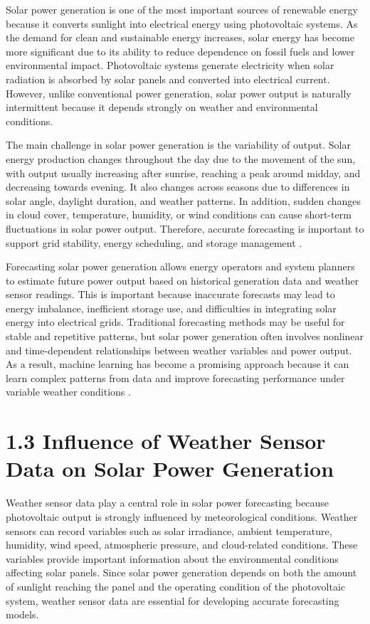 Solar power generation is one of the most important sources of renewable energy because it converts sunlight into electrical energy using photovoltaic systems. As the demand for clean and sustainable energy increases, solar energy has become more significant due to its ability to reduce dependence on fossil fuels and lower environmental impact. Photovoltaic systems generate electricity when solar radiation is absorbed by solar panels and converted into electrical current. However, unlike conventional power generation, solar power output is naturally intermittent because it depends strongly on weather and environmental conditions.

The main challenge in solar power generation is the variability of output. Solar energy production changes throughout the day due to the movement of the sun, with output usually increasing after sunrise, reaching a peak around midday, and decreasing towards evening. It also changes across seasons due to differences in solar angle, daylight duration, and weather patterns. In addition, sudden changes in cloud cover, temperature, humidity, or wind conditions can cause short-term fluctuations in solar power output. Therefore, accurate forecasting is important to support grid stability, energy scheduling, and storage management \parencite{JnanaVarshitha2025, Bakht2025, Eren2025, Alhassan2025}.

Forecasting solar power generation allows energy operators and system planners to estimate future power output based on historical generation data and weather sensor readings. This is important because inaccurate forecasts may lead to energy imbalance, inefficient storage use, and difficulties in integrating solar energy into electrical grids. Traditional forecasting methods may be useful for stable and repetitive patterns, but solar power generation often involves nonlinear and time-dependent relationships between weather variables and power output. As a result, machine learning has become a promising approach because it can learn complex patterns from data and improve forecasting performance under variable weather conditions \parencite{TsaiLo2025, CarvalhoJunior2025, ArellanosTafur2025}.

\section{1.3  Influence of Weather Sensor Data on Solar Power Generation}

Weather sensor data play a central role in solar power forecasting because photovoltaic output is strongly influenced by meteorological conditions. Weather sensors can record variables such as solar irradiance, ambient temperature, humidity, wind speed, atmospheric pressure, and cloud-related conditions. These variables provide important information about the environmental conditions affecting solar panels. Since solar power generation depends on both the amount of sunlight reaching the panel and the operating condition of the photovoltaic system, weather sensor data are essential for developing accurate forecasting models.


